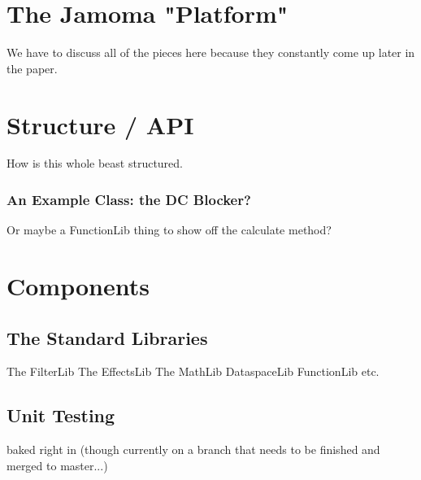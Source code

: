 \documentclass[twoside,10pt]{article}
\begin{document}



\section{The Jamoma "Platform"} %

We have to discuss all of the pieces here because they constantly come up later in the paper.





\section{Structure / API} %

How is this whole beast structured.

\subsubsection{An Example Class: the DC Blocker?}

Or maybe a FunctionLib thing to show off the calculate method?



\section{Components} %

\subsection{The Standard Libraries}

The FilterLib
The EffectsLib
The MathLib
DataspaceLib
FunctionLib
etc.

\subsection{Unit Testing}

baked right in (though currently on a branch that needs to be finished and merged to master...)
\end{document}
